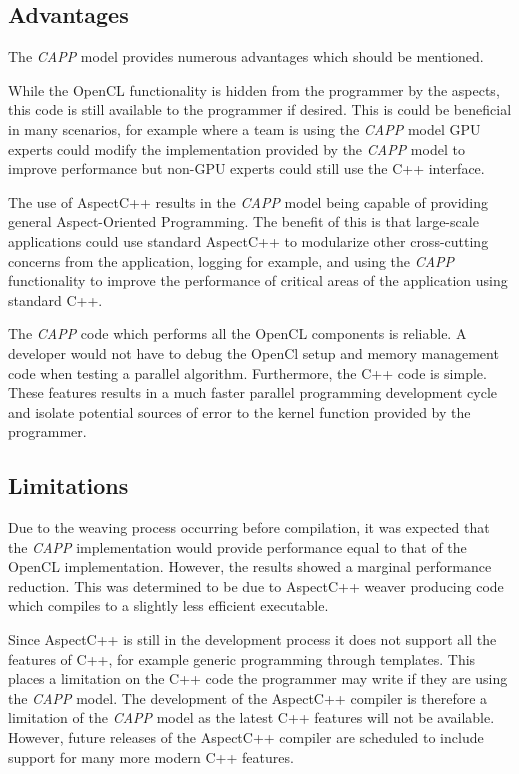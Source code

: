 \documentclass{sig-alternate-05-2015}
\begin{document}
\subsection{Advantages}

The \textit{CAPP} model provides numerous advantages which should be mentioned.

While the OpenCL functionality is hidden from the programmer by the aspects,
this code is still available to the programmer if desired. This is could be
beneficial in many scenarios, for example where a team is using the
\textit{CAPP} model GPU experts could modify the implementation provided by the
\textit{CAPP} model to improve performance but non-GPU experts could still use
the C++ interface.  

The use of AspectC++ results in the \textit{CAPP} model being capable of
providing general Aspect-Oriented Programming. The benefit of this is that
large-scale applications could use standard AspectC++ to modularize other
cross-cutting concerns from the application, logging for example, and using the
\textit{CAPP} functionality to improve the performance of critical areas of the
application using standard C++.

The \textit{CAPP} code which performs all the OpenCL components is reliable.
A developer would not have to debug the OpenCl setup and memory management code
when testing a parallel algorithm. Furthermore, the C++ code is simple. These
features results in a much faster parallel programming development cycle and
isolate potential sources of error to the kernel function provided by the
programmer.

\subsection{Limitations}

Due to the weaving process occurring before compilation, it was expected that
the \textit{CAPP} implementation would provide performance equal to that of the
OpenCL implementation. However, the results showed a marginal performance
reduction. This was determined to be due to AspectC++ weaver producing code
which compiles to a slightly less efficient executable. 

Since AspectC++ is still in the development process it does not support all 
the features of C++, for example generic programming through templates. 
This places a limitation on the C++ code  the programmer may write if they 
are using the \textit{CAPP} model. The development of the AspectC++ compiler 
is therefore a limitation of the \textit{CAPP} model as the latest C++ 
features will not be available. However, future releases of the AspectC++
compiler are scheduled to include support for many more modern C++ features.
\end{document}
